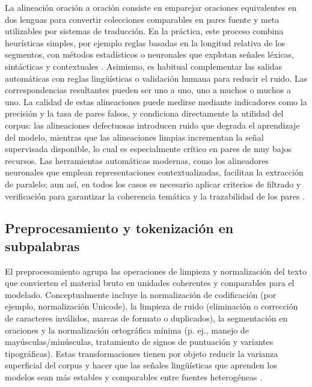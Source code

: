 \documentclass[12pt,a4paper,oneside]{book}
\begin{document}
La alineación oración a oración consiste en emparejar oraciones equivalentes en dos lenguas para convertir colecciones comparables en pares fuente y meta utilizables por sistemas de traducción. En la práctica, este proceso combina heurísticas simples, por ejemplo reglas basadas en la longitud relativa de los segmentos, con métodos estadísticos o neuronales que explotan señales léxicas, sintácticas y contextuales \parencite{gale1993alignment}. Asimismo, es habitual complementar las salidas automáticas con reglas lingüísticas o validación humana para reducir el ruido. Las correspondencias resultantes pueden ser uno a uno, uno a muchos o muchos a uno. La calidad de estas alineaciones puede medirse mediante indicadores como la precisión y la tasa de pares falsos, y condiciona directamente la utilidad del corpus: las alineaciones defectuosas introducen ruido que degrada el aprendizaje del modelo, mientras que las alineaciones limpias incrementan la señal supervisada disponible, lo cual es especialmente crítico en pares de muy bajos recursos. Las herramientas automáticas modernas, como los alineadores neuronales que emplean representaciones contextualizadas, facilitan la extracción de paralelo; aun así, en todos los casos es necesario aplicar criterios de filtrado y verificación para garantizar la coherencia temática y la trazabilidad de los pares \parencite{koehn2017,artetxe2019}.

\subsection{Preprocesamiento y tokenización en subpalabras}\label{preprocesamiento-y-tokenizaciuxf3n-sub-palabra}

El preprocesamiento agrupa las operaciones de limpieza y normalización del texto que convierten el material bruto en unidades coherentes y comparables para el modelado. Conceptualmente incluye la normalización de codificación (por ejemplo, normalización Unicode), la limpieza de ruido (eliminación o corrección de caracteres inválidos, marcas de formato o duplicados), la segmentación en oraciones y la normalización ortográfica mínima (p. ej., manejo de mayúsculas/minúsculas, tratamiento de signos de puntuación y variantes tipográficas). Estas transformaciones tienen por objeto reducir la varianza superficial del corpus y hacer que las señales lingüísticas que aprenden los modelos sean más estables y comparables entre fuentes heterogéneas \parencite{koehn2017,kudo2018sentencepiece}.
\end{document}
